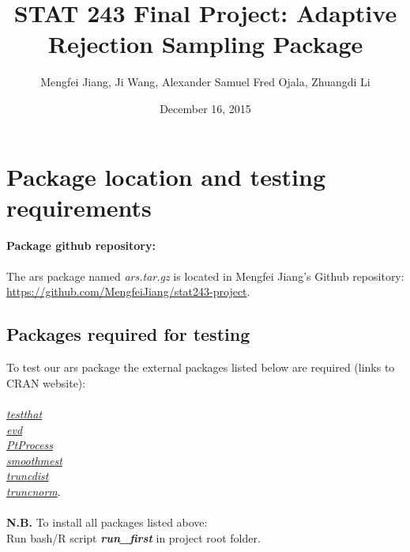 \documentclass{article}\usepackage[]{graphicx}\usepackage[]{color}
\begin{document}
 

\title{STAT 243 Final Project: Adaptive Rejection Sampling Package}
\author{Mengfei Jiang, Ji Wang, Alexander Samuel Fred Ojala, Zhuangdi Li}
\date{December 16, 2015}

\maketitle

\tableofcontents

\newpage

\section{Package location and testing requirements}

\large{\textbf{Package github repository:}}\\
\\
\normalsize{The ars package named \textit{ars.tar.gz} is located in Mengfei Jiang's Github repository: \\
\large{\url{https://github.com/MengfeiJiang/stat243-project}}}.\\
\subsection{Packages required for testing}
\normalsize{To test our ars package the external packages listed below are required (links to CRAN website):}\\
\\
\href{https://cran.r-project.org/web/packages/testthat/index.html}{\textit{testthat}}\\
\href{https://cran.r-project.org/web/packages/evd/index.html}{\textit{evd}}\\
\href{https://cran.r-project.org/web/packages/PtProcess/index.html}{\textit{PtProcess}}\\
\href{https://cran.r-project.org/web/packages/smoothmest/index.html}{\textit{smoothmest}}\\
\href{https://cran.r-project.org/web/packages/truncdist/index.html}{\textit{truncdist}}\\
\href{https://cran.r-project.org/web/packages/truncnorm/index.html}{\textit{truncnorm}}.
\\
\\
\Large{\textbf{N.B.} To install all packages listed above:\\
Run bash/R script \textbf{\textit{run\_first}} in project root folder.} \\
\end{document}
